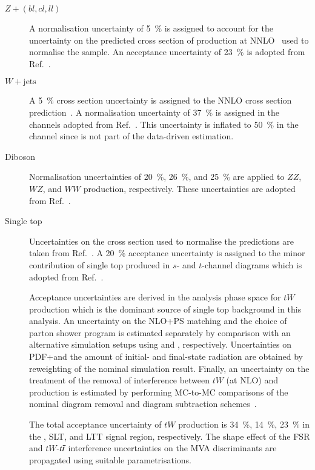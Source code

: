 \begin{description}

\item[$Z + (bl, cl, ll)$] A normalisation uncertainty of
  \SI{5}{\percent} is assigned to account for the uncertainty on the
  predicted cross section of \Zjets production at
  NNLO~\cite{Anastasiou:2003ds} used to normalise the sample. An
  acceptance uncertainty of \SI{23}{\percent} is adopted from
  Ref.~\cite{HIGG-2018-51}.

\item[$W + \text{jets}$] A \SI{5}{\percent} cross section uncertainty
  is assigned to the NNLO cross section
  prediction~\cite{Anastasiou:2003ds}. A normalisation uncertainty of
  \SI{37}{\percent} is assigned in the \lephad channels adopted from
  Ref.~\cite{HIGG-2018-51}. This uncertainty is inflated to
  \SI{50}{\percent} in the \hadhad channel since \Wjets is not part of
  the data-driven \faketauhadvis estimation.

\item[Diboson] Normalisation uncertainties of \SI{20}{\percent},
  \SI{26}{\percent}, and \SI{25}{\percent} are applied to $ZZ$, $WZ$,
  and $WW$ production, respectively. These uncertainties are adopted
  from Ref.~\cite{HIGG-2018-51}.

\item[Single top] Uncertainties on the cross section used to normalise
  the predictions are taken from Ref.~\cite{stopxsec}. A
  \SI{20}{\percent} acceptance uncertainty is assigned to the minor
  contribution of single top produced in $s$- and $t$-channel diagrams
  which is adopted from Ref.~\cite{HIGG-2018-51}.

  Acceptance uncertainties are derived in the analysis phase space for
  $tW$ production which is the dominant source of single top
  background in this analysis. An uncertainty on the NLO+PS matching
  and the choice of parton shower program is estimated separately by
  comparison with an alternative simulation setups using \MGNLO[2.6.2]
  and \HERWIG[7], respectively. Uncertainties on PDF+\alphas and the
  amount of initial- and final-state radiation are obtained by
  reweighting of the nominal simulation result. Finally, an
  uncertainty on the treatment of the removal of interference between
  $tW$ (at NLO) and \ttbar production is estimated by performing
  MC-to-MC comparisons of the nominal diagram removal and diagram
  subtraction schemes~\cite{Frixione:2008yi}.

  The total acceptance uncertainty of $tW$ production is
  \SI{34}{\percent}, \SI{14}{\percent}, \SI{23}{\percent} in the
  \hadhad, \lephad SLT, and \lephad LTT signal region,
  respectively. The shape effect of the FSR and $tW$-$t\bar{t}$
  interference uncertainties on the MVA discriminants are propagated
  using suitable parametrisations.


\end{description}
